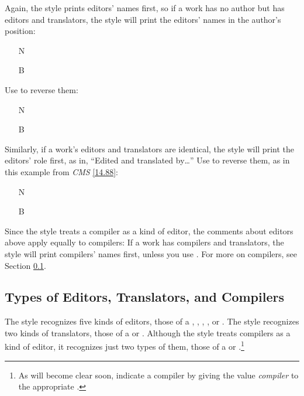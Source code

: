 \documentclass[11pt,letterpaper,oneside]{article}
\begin{document}
Again, the style prints editors' names first, so if a work has no
author but has editors and translators, the style will print the
editors' names in the author's position:

\begin{itemize}
\item[N] 

\item[B] 
\end{itemize}

\noindent Use  to reverse them:

\begin{itemize}
\item[N] 

\item[B] 
\end{itemize}

Similarly, if a work's editors and translators are identical, the
style will print the editors' role first, as in, ``Edited and
translated by\ldots'' Use  to reverse them, as in this
example from \textit{CMS} \ref{14.88}:

\begin{itemize}
\item[N] 

\item[B] 
\end{itemize}

Since the style treats a compiler as a kind of editor, the comments
about editors above apply equally to compilers: If a work has
compilers and translators, the style will print compilers' names
first, unless you use . For more on compilers, see
Section \ref{edtransnames}.

\subsection{Types of Editors, Translators, and Compilers}
\label{edtransnames}

The style recognizes five kinds of editors, those of a
, , ,
, or . The style recognizes two
kinds of translators, those of a  or
. Although the style treats compilers as a kind of
editor, it recognizes just two types of them, those of a
 or .\footnote{As will become
clear soon, indicate a compiler by giving the value \textit{compiler}
to the appropriate .}
\end{document}
